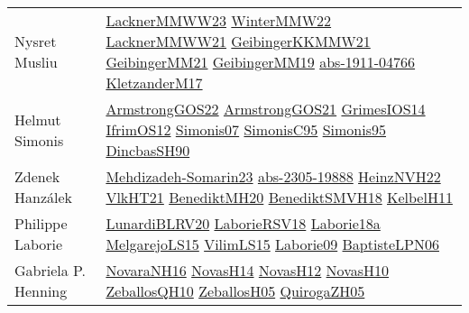 {\begin{longtable}{p{4cm}p{20cm}}
Nysret Musliu & \href{articles/LacknerMMWW23.pdf}{LacknerMMWW23}\cite{LacknerMMWW23} \href{papers/WinterMMW22.pdf}{WinterMMW22}\cite{WinterMMW22} \href{papers/LacknerMMWW21.pdf}{LacknerMMWW21}\cite{LacknerMMWW21} \href{papers/GeibingerKKMMW21.pdf}{GeibingerKKMMW21}\cite{GeibingerKKMMW21} \href{papers/GeibingerMM21.pdf}{GeibingerMM21}\cite{GeibingerMM21} \href{papers/GeibingerMM19.pdf}{GeibingerMM19}\cite{GeibingerMM19} \href{articles/abs-1911-04766.pdf}{abs-1911-04766}\cite{abs-1911-04766} \href{papers/KletzanderM17.pdf}{KletzanderM17}\cite{KletzanderM17} \\
Helmut Simonis & \href{papers/ArmstrongGOS22.pdf}{ArmstrongGOS22}\cite{ArmstrongGOS22} \href{papers/ArmstrongGOS21.pdf}{ArmstrongGOS21}\cite{ArmstrongGOS21} \href{articles/GrimesIOS14.pdf}{GrimesIOS14}\cite{GrimesIOS14} \href{papers/IfrimOS12.pdf}{IfrimOS12}\cite{IfrimOS12} \href{articles/Simonis07.pdf}{Simonis07}\cite{Simonis07} \href{papers/SimonisC95.pdf}{SimonisC95}\cite{SimonisC95} \href{papers/Simonis95.pdf}{Simonis95}\cite{Simonis95} \href{articles/DincbasSH90.pdf}{DincbasSH90}\cite{DincbasSH90} \\
Zdenek Hanz{\'{a}}lek & \href{papers/Mehdizadeh-Somarin23.pdf}{Mehdizadeh-Somarin23}\cite{Mehdizadeh-Somarin23} \href{articles/abs-2305-19888.pdf}{abs-2305-19888}\cite{abs-2305-19888} \href{articles/HeinzNVH22.pdf}{HeinzNVH22}\cite{HeinzNVH22} \href{articles/VlkHT21.pdf}{VlkHT21}\cite{VlkHT21} \href{articles/BenediktMH20.pdf}{BenediktMH20}\cite{BenediktMH20} \href{papers/BenediktSMVH18.pdf}{BenediktSMVH18}\cite{BenediktSMVH18} \href{articles/KelbelH11.pdf}{KelbelH11}\cite{KelbelH11} \\
Philippe Laborie & \href{articles/LunardiBLRV20.pdf}{LunardiBLRV20}\cite{LunardiBLRV20} \href{articles/LaborieRSV18.pdf}{LaborieRSV18}\cite{LaborieRSV18} \href{papers/Laborie18a.pdf}{Laborie18a}\cite{Laborie18a} \href{papers/MelgarejoLS15.pdf}{MelgarejoLS15}\cite{MelgarejoLS15} \href{papers/VilimLS15.pdf}{VilimLS15}\cite{VilimLS15} \href{papers/Laborie09.pdf}{Laborie09}\cite{Laborie09} \href{}{BaptisteLPN06}\cite{BaptisteLPN06} \\
Gabriela P. Henning & \href{articles/NovaraNH16.pdf}{NovaraNH16}\cite{NovaraNH16} \href{articles/NovasH14.pdf}{NovasH14}\cite{NovasH14} \href{articles/NovasH12.pdf}{NovasH12}\cite{NovasH12} \href{articles/NovasH10.pdf}{NovasH10}\cite{NovasH10} \href{articles/ZeballosQH10.pdf}{ZeballosQH10}\cite{ZeballosQH10} \href{articles/ZeballosH05.pdf}{ZeballosH05}\cite{ZeballosH05} \href{papers/QuirogaZH05.pdf}{QuirogaZH05}\cite{QuirogaZH05} \\

\end{longtable}}
